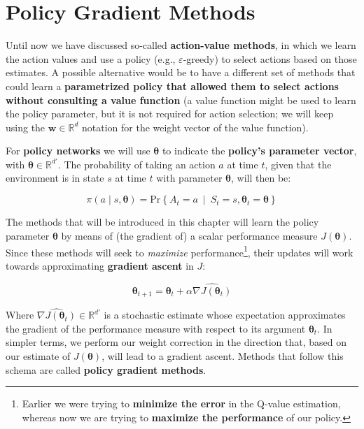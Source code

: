 \chapter{Policy Gradient Methods}
Until now we have discussed so-called \textbf{action-value methods}, in which we learn the action values and use a policy (e.g., $\varepsilon$-greedy) to select actions based on those estimates. A possible alternative would be to have a different set of methods that could learn a \textbf{parametrized policy that allowed them to select actions without consulting a value function} (a value function might be used to learn the policy parameter, but it is not required for action selection; we will keep using the $\boldsymbol{w} \in \mathbb{R}^d$ notation for the weight vector of the value function).

For \textbf{policy networks} we will use $\boldsymbol{\theta}$ to indicate the \textbf{policy’s parameter vector}, with $\boldsymbol{\theta} \in \mathbb{R}^{d'}$. The probability of taking an action $a$ at time $t$, given that the environment is in state $s$ at time $t$ with parameter $\boldsymbol{\theta}$, will then be:

\begin{equation*}
    \pi \left( a \middle\vert s, \boldsymbol{\theta} \right) = \text{Pr}\left\{ A_t = a \ \middle\vert \ S_t = s, \boldsymbol{\theta}_t = \boldsymbol{\theta} \right\}
\end{equation*}

The methods that will be introduced in this chapter will learn the policy parameter $\boldsymbol{\theta}$ by means of (the gradient of) a scalar performance measure $J(\boldsymbol{\theta})$. Since these methods will seek to \textit{maximize} performance\footnote{Earlier we were trying to \textbf{minimize the error} in the Q-value estimation, whereas now we are trying to \textbf{maximize the performance} of our policy.}, their updates will work towards approximating \textbf{gradient ascent} in $J$:

\begin{equation}
    \boldsymbol{\theta}_{t+1} = \boldsymbol{\theta}_t + \alpha \widehat{\nabla J(\boldsymbol{\theta}_t)}
    \label{eq:ch8-gradientascentupdate}
\end{equation}

Where $\widehat{\nabla J(\boldsymbol{\theta}_t)} \in \mathbb{R}^{d'}$ is a stochastic estimate whose expectation approximates the gradient of the performance measure with respect to its argument $\boldsymbol{\theta}_t$. In simpler terms, we perform our weight correction in the direction that, based on our estimate of $J(\boldsymbol{\theta})$, will lead to a gradient ascent. Methods that follow this schema are called \textbf{policy gradient methods}.

